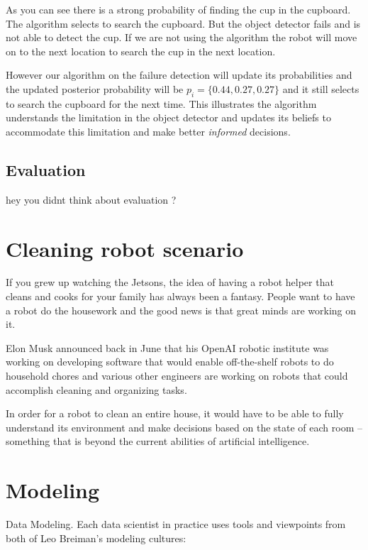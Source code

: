 \documentclass[11pt]{report}
\begin{document}
As you can see there is a strong probability of finding the cup in the cupboard. The algorithm selects to search the cupboard. But the object detector fails and is not able to detect the cup. If we are not using the algorithm the robot will move on to the next location to search the cup in the next location.



However our algorithm on the failure detection will update its probabilities and the updated posterior probability will be $ p_i = \{ 0.44, 0.27, 0.27\}$ and it still selects to search the cupboard for the next time. This illustrates the algorithm understands the limitation in the object detector and updates its beliefs to accommodate this limitation and make better \emph{informed} decisions.  

 
\section{Evaluation}
hey you didnt think about evaluation ? 

\chapter{Cleaning robot scenario}

If you grew up watching the Jetsons, the idea of having a robot helper that cleans and cooks for your family has always been a fantasy. People want to have a robot do the housework and the good news is that great minds are working on it.

Elon Musk announced back in June that his OpenAI robotic institute was working on developing software that would enable off-the-shelf robots to do household chores and various other engineers are working on robots that could accomplish cleaning and organizing tasks.

 In order for a robot to clean an entire house, it would have to be able to fully understand its environment and make decisions based on the state of each room -- something that is beyond the current abilities of artificial intelligence. 
 \cite{http://www.treehugger.com/gadgets/want-robot-clean-your-house-youll-have-wait-bit-longer.html}
 
\chapter{Modeling}
Data Modeling.
Each data scientist in practice uses tools and viewpoints from
both
of
Leo Breiman's modeling cultures:
\end{document}
